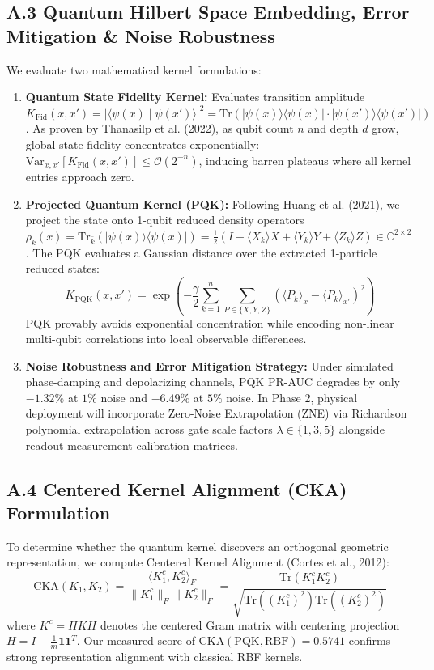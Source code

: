 \documentclass[10pt,a4paper]{article}
\begin{document}
\subsection*{A.3 Quantum Hilbert Space Embedding, Error Mitigation \& Noise Robustness}
We evaluate two mathematical kernel formulations:
\begin{enumerate}[leftmargin=*,itemsep=0.3pt,topsep=0.5pt]
\item \textbf{Quantum State Fidelity Kernel:} Evaluates transition amplitude $K_{\text{Fid}}(x, x') = |\langle \psi(x) \mid \psi(x') \rangle|^2 = \mathrm{Tr}(|\psi(x)\rangle\langle\psi(x)| \cdot |\psi(x')\rangle\langle\psi(x')|)$. As proven by Thanasilp et al. (2022), as qubit count $n$ and depth $d$ grow, global state fidelity concentrates exponentially: $\mathrm{Var}_{x, x'}[K_{\text{Fid}}(x, x')] \le \mathcal{O}(2^{-n})$, inducing barren plateaus where all kernel entries approach zero.
\item \textbf{Projected Quantum Kernel (PQK):} Following Huang et al. (2021), we project the state onto 1-qubit reduced density operators $\rho_k(x) = \mathrm{Tr}_{\bar{k}}(|\psi(x)\rangle\langle\psi(x)|) = \frac{1}{2} (I + \langle X_k \rangle X + \langle Y_k \rangle Y + \langle Z_k \rangle Z) \in \mathbb{C}^{2 \times 2}$. The PQK evaluates a Gaussian distance over the extracted 1-particle reduced states:
\begin{equation}
K_{\text{PQK}}(x, x') = \exp\left( -\frac{\gamma}{2} \sum_{k=1}^n \sum_{P \in \{X, Y, Z\}} (\langle P_k \rangle_x - \langle P_k \rangle_{x'})^2 \right)
\end{equation}
PQK provably avoids exponential concentration while encoding non-linear multi-qubit correlations into local observable differences.
\item \textbf{Noise Robustness and Error Mitigation Strategy:} Under simulated phase-damping and depolarizing channels, PQK PR-AUC degrades by only $-1.32\%$ at $1\%$ noise and $-6.49\%$ at $5\%$ noise. In Phase 2, physical deployment will incorporate Zero-Noise Extrapolation (ZNE) via Richardson polynomial extrapolation across gate scale factors $\lambda \in \{1, 3, 5\}$ alongside readout measurement calibration matrices.
\end{enumerate}

\subsection*{A.4 Centered Kernel Alignment (CKA) Formulation}
To determine whether the quantum kernel discovers an orthogonal geometric representation, we compute Centered Kernel Alignment (Cortes et al., 2012):
\begin{equation}
\mathrm{CKA}(K_1, K_2) = \frac{\langle K_1^c, K_2^c \rangle_F}{\|K_1^c\|_F \|K_2^c\|_F} = \frac{\mathrm{Tr}(K_1^c K_2^c)}{\sqrt{\mathrm{Tr}((K_1^c)^2) \mathrm{Tr}((K_2^c)^2)}}
\end{equation}
where $K^c = H K H$ denotes the centered Gram matrix with centering projection $H = I - \frac{1}{m}\mathbf{1}\mathbf{1}^T$. Our measured score of \textbf{$\mathrm{CKA}(\text{PQK}, \text{RBF}) = 0.5741$} confirms strong representation alignment with classical RBF kernels.
\end{document}
